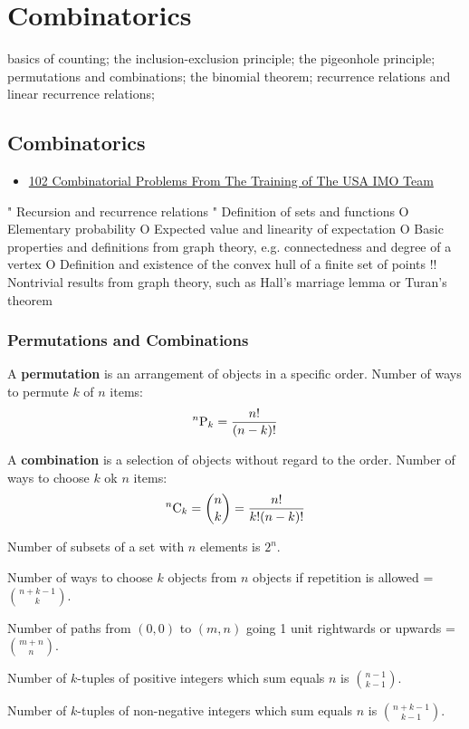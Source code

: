 \part{Combinatorics}
basics of counting; the inclusion-exclusion principle; the pigeonhole principle; permutations and combinations; the binomial theorem; recurrence relations and linear recurrence relations; 

\chapter{Combinatorics}
\begin{itemize}
\item \href{https://rainymathboy.files.wordpress.com/2011/01/102-combinatorial-problems.pdf}{102 Combinatorial Problems From The Training of The USA IMO Team}
\end{itemize}

" Recursion and recurrence relations
" Definition of sets and functions
O Elementary probability
O Expected value and linearity of expectation
O Basic properties and definitions from graph theory, e.g. connectedness and degree of a vertex
O Definition and existence of the convex hull of a finite set of points %
!! Nontrivial results from graph theory, such as Hall's marriage lemma or Turan’s theorem
\pagebreak

\section{Permutations and Combinations}
A \textbf{permutation} is an arrangement of objects in a specific order. Number of ways to permute $k$ of $n$ items:
\[ ^{n}\mathrm{P}_{k} = \frac{n!}{(n-k)!} \]

A \textbf{combination} is a selection of objects without regard to the order. Number of ways to choose $k$ ok $n$ items:
\[ ^{n}\mathrm{C}_{k} = \binom{n}{k} = \frac{n!}{k!(n-k)!} \]

Number of subsets of a set with $n$ elements is $2^n$.

Number of ways to choose $k$ objects from $n$ objects if repetition is allowed = $\binom{n+k-1}{k}$.

Number of paths from $(0,0)$ to $(m,n)$ going 1 unit rightwards or upwards = $\binom{m+n}{n}$.

Number of $k$-tuples of positive integers which sum equals $n$ is $\binom{n-1}{k-1}$.

Number of $k$-tuples of non-negative integers which sum equals $n$ is $\binom{n+k-1}{k-1}$.

